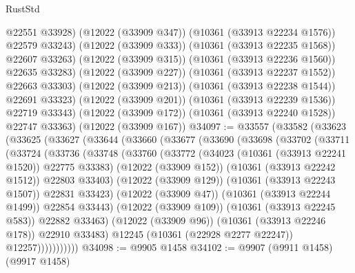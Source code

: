 \begin{lexlean}{RustStd}
\begin{coremodule}
                    @22551
                    @33928)
                  (@12022 (@33909 @347))
                  (@10361 (@33913 @22234 @1576))
                  @22579
                  @33243)
                (@12022 (@33909 @333))
                (@10361 (@33913 @22235 @1568))
                @22607
                @33263)
              (@12022 (@33909 @315))
              (@10361 (@33913 @22236 @1560))
              @22635
              @33283)
            (@12022 (@33909 @227))
            (@10361 (@33913 @22237 @1552))
            @22663
            @33303)
          (@12022 (@33909 @213))
          (@10361 (@33913 @22238 @1544))
          @22691
          @33323)
        (@12022 (@33909 @201))
        (@10361 (@33913 @22239 @1536))
        @22719
        @33343)
      (@12022 (@33909 @172))
      (@10361 (@33913 @22240 @1528))
      @22747
      @33363)
    (@12022 (@33909 @167))
@34097 := @33557
    (@33582
      (@33623
        (@33625
          (@33627
            (@33644
              (@33660
                (@33677
                  (@33690
                    (@33698
                      (@33702
                        (@33711
                          (@33724
                            (@33736
                              (@33748
                                (@33760
                                  (@33772
                                    (@34023 (@10361 (@33913 @22241 @1520)) @22775 @33383)
                                    (@12022 (@33909 @152))
                                    (@10361 (@33913 @22242 @1512))
                                    @22803
                                    @33403)
                                  (@12022 (@33909 @129))
                                  (@10361 (@33913 @22243 @1507))
                                  @22831
                                  @33423)
                                (@12022 (@33909 @47))
                                (@10361 (@33913 @22244 @1499))
                                @22854
                                @33443)
                              (@12022 (@33909 @109))
                              (@10361 (@33913 @22245 @583))
                              @22882
                              @33463)
                            (@12022 (@33909 @96))
                            (@10361 (@33913 @22246 @178))
                            @22910
                            @33483)
                          @12245
                          (@10361 (@22928 @2277 @22247))
                          @12257)))))))))))
@34098 := @9905 @1458
@34102 := @9907 (@9911 @1458) (@9917 @1458)

\end{coremodule}
\end{lexlean}
